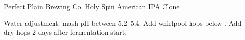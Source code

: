 \begin{recipe}{Perfect Plain Brewing Co. Holy Spin American IPA Clone}

\begin{aboutblock}
\sourceaha
\end{aboutblock}


\begin{methodandtiming}
 
\begin{mashsteps}
\end{mashsteps}

\begin{fermentationsteps}
\end{fermentationsteps}

\begin{directions}
Water adjustment: mash pH between 5.2--5.4. Add whirlpool hops below .
Add dry hops 2 days after fermentation start.
\end{directions}

\end{methodandtiming}

\recipebreak

\begin{ingredientsblock}

\begin{malts}
\end{malts}

\begin{hops}
\end{hops}


\end{ingredientsblock}

\end{recipe}

